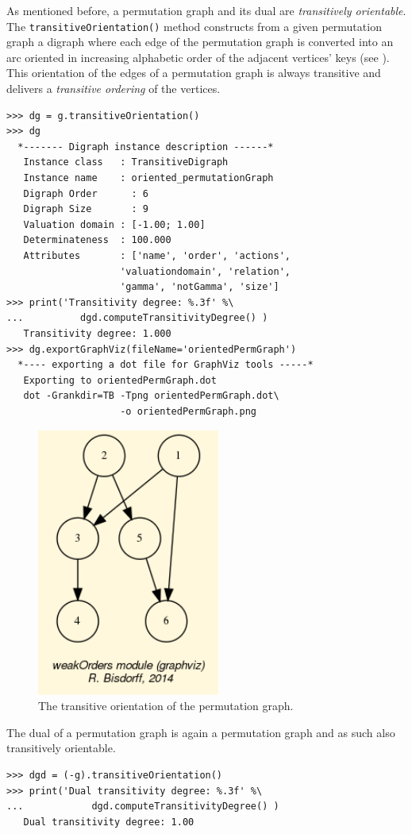 As mentioned before, a permutation graph and its dual are \emph{transitively orientable}. The \texttt{transitiveOrientation()} method constructs from a given permutation graph a digraph where each edge of the permutation graph is converted into an arc oriented in increasing alphabetic order of the adjacent vertices' keys (see \citet{GOL-2004}). This orientation of the edges of a permutation graph is always transitive and delivers a \emph{transitive ordering} of the vertices.
\begin{lstlisting}
>>> dg = g.transitiveOrientation()
>>> dg
  *------- Digraph instance description ------*
   Instance class   : TransitiveDigraph
   Instance name    : oriented_permutationGraph
   Digraph Order      : 6
   Digraph Size       : 9
   Valuation domain : [-1.00; 1.00]
   Determinateness  : 100.000
   Attributes       : ['name', 'order', 'actions',
                    'valuationdomain', 'relation',
                    'gamma', 'notGamma', 'size']
>>> print('Transitivity degree: %.3f' %\
...          dgd.computeTransitivityDegree() ) 
   Transitivity degree: 1.000
>>> dg.exportGraphViz(fileName='orientedPermGraph')
  *---- exporting a dot file for GraphViz tools -----*
   Exporting to orientedPermGraph.dot
   dot -Grankdir=TB -Tpng orientedPermGraph.dot\
                    -o orientedPermGraph.png
\end{lstlisting}
\begin{figure}[h]
\sidecaption
\includegraphics[width=6cm]{Figures/oriented_permutationGraph.png}
\caption{The transitive orientation of the permutation graph.} 
\label{fig:25.7}       %
\end{figure}

The dual of a permutation graph is again a permutation graph and as such also transitively orientable.
\begin{lstlisting}
>>> dgd = (-g).transitiveOrientation()
>>> print('Dual transitivity degree: %.3f' %\
...            dgd.computeTransitivityDegree() )
   Dual transitivity degree: 1.00
\end{lstlisting}

